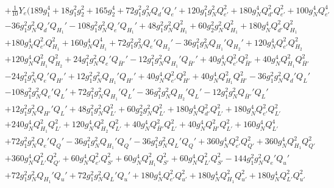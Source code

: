 {\begin{align}
 &+\frac{1}{10} Y_e \Big(189 g_{1}^{4} +18 g_{1}^{2} g_{2}^{2} +165 g_{2}^{4} +72 g_{1}^{2} g_{N}^{2} Q_d' Q_e' +120 g_{1}^{2} g_{N}^{2} Q_{e'}^{2} +180 g_{N}^{4} Q_{d'}^{2} Q_{e'}^{2} +100 g_{N}^{4} Q_{e'}^{4} \nonumber \\ 
 &-36 g_{1}^{2} g_{N}^{2} Q_d' Q_{H_1}' -108 g_{1}^{2} g_{N}^{2} Q_e' Q_{H_1}' +48 g_{1}^{2} g_{N}^{2} Q_{H_1}^{2} +60 g_{2}^{2} g_{N}^{2} Q_{H_1}^{2} +180 g_{N}^{4} Q_{d'}^{2} Q_{H_1}^{2} \nonumber \\ 
 &+180 g_{N}^{4} Q_{e'}^{2} Q_{H_1}^{2} +160 g_{N}^{4} Q_{H_1}^{4} +72 g_{1}^{2} g_{N}^{2} Q_e' Q_{H_2}' -36 g_{1}^{2} g_{N}^{2} Q_{H_1}' Q_{H_2}' +120 g_{N}^{4} Q_{e'}^{2} Q_{H_2}^{2} \nonumber \\ 
 &+120 g_{N}^{4} Q_{H_1}^{2} Q_{H_2}^{2} +24 g_{1}^{2} g_{N}^{2} Q_e' Q_{\bar{H}'}' -12 g_{1}^{2} g_{N}^{2} Q_{H_1}' Q_{\bar{H}'}' +40 g_{N}^{4} Q_{e'}^{2} Q_{\bar{H}'}^{2} +40 g_{N}^{4} Q_{H_1}^{2} Q_{\bar{H}'}^{2} \nonumber \\ 
 &-24 g_{1}^{2} g_{N}^{2} Q_e' Q_{H'}' +12 g_{1}^{2} g_{N}^{2} Q_{H_1}' Q_{H'}' +40 g_{N}^{4} Q_{e'}^{2} Q_{H'}^{2} +40 g_{N}^{4} Q_{H_1}^{2} Q_{H'}^{2} -36 g_{1}^{2} g_{N}^{2} Q_d' Q_L' \nonumber \\ 
 &-108 g_{1}^{2} g_{N}^{2} Q_e' Q_L' +72 g_{1}^{2} g_{N}^{2} Q_{H_1}' Q_L' -36 g_{1}^{2} g_{N}^{2} Q_{H_2}' Q_L' -12 g_{1}^{2} g_{N}^{2} Q_{\bar{H}'}' Q_L' \nonumber \\ 
 &+12 g_{1}^{2} g_{N}^{2} Q_{H'}' Q_L' +48 g_{1}^{2} g_{N}^{2} Q_{L'}^{2} +60 g_{2}^{2} g_{N}^{2} Q_{L'}^{2} +180 g_{N}^{4} Q_{d'}^{2} Q_{L'}^{2} +180 g_{N}^{4} Q_{e'}^{2} Q_{L'}^{2} \nonumber \\ 
 &+240 g_{N}^{4} Q_{H_1}^{2} Q_{L'}^{2} +120 g_{N}^{4} Q_{H_2}^{2} Q_{L'}^{2} +40 g_{N}^{4} Q_{\bar{H}'}^{2} Q_{L'}^{2} +40 g_{N}^{4} Q_{H'}^{2} Q_{L'}^{2} +160 g_{N}^{4} Q_{L'}^{4} \nonumber \\ 
 &+72 g_{1}^{2} g_{N}^{2} Q_e' Q_Q' -36 g_{1}^{2} g_{N}^{2} Q_{H_1}' Q_Q' -36 g_{1}^{2} g_{N}^{2} Q_L' Q_Q' +360 g_{N}^{4} Q_{e'}^{2} Q_{Q'}^{2} +360 g_{N}^{4} Q_{H_1}^{2} Q_{Q'}^{2} \nonumber \\ 
 &+360 g_{N}^{4} Q_{L'}^{2} Q_{Q'}^{2} +60 g_{N}^{4} Q_{e'}^{2} Q_{S'}^{2} +60 g_{N}^{4} Q_{H_1}^{2} Q_{S'}^{2} +60 g_{N}^{4} Q_{L'}^{2} Q_{S'}^{2} -144 g_{1}^{2} g_{N}^{2} Q_e' Q_u' \nonumber \\ 
 &+72 g_{1}^{2} g_{N}^{2} Q_{H_1}' Q_u' +72 g_{1}^{2} g_{N}^{2} Q_L' Q_u' +180 g_{N}^{4} Q_{e'}^{2} Q_{u'}^{2} +180 g_{N}^{4} Q_{H_1}^{2} Q_{u'}^{2} +180 g_{N}^{4} Q_{L'}^{2} Q_{u'}^{2} \nonumber \\ 

\end{align}}
